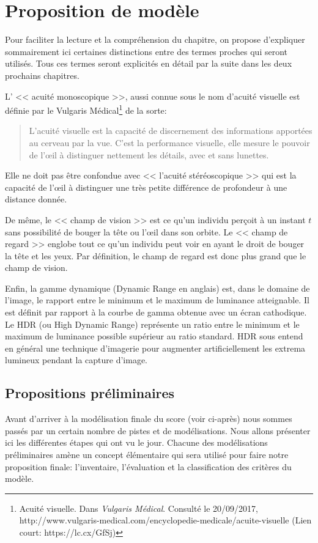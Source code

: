 	\chapter{Proposition de modèle}
	\par Pour faciliter la lecture et la compréhension du chapitre, on propose d'expliquer sommairement ici certaines distinctions entre des termes proches qui seront utilisés. Tous ces termes seront explicités en détail par la suite dans les deux prochains chapitres.

	\par L' << acuité monoscopique >>, aussi connue sous le nom d'acuité visuelle est définie par le Vulgaris Médical\footnote{Acuité visuelle. Dans \textit{Vulgaris Médical}. Consulté le 20/09/2017, http://www.vulgaris-medical.com/encyclopedie-medicale/acuite-visuelle (Lien court: https://lc.cx/GfSj)} de la sorte:
	\begin{quote}
		L'acuité visuelle est la capacité de discernement des informations apportées au cerveau par la vue. C'est la performance visuelle, elle mesure le pouvoir de l'œil à distinguer nettement les détails, avec et sans lunettes.
	\end{quote}
	Elle ne doit pas être confondue avec << l'acuité stéréoscopique >> qui est la capacité de l'œil à distinguer une très petite différence de profondeur à une distance donnée.
	
	\par De même, le << champ de vision >> est ce qu'un individu perçoit à un instant $t$ sans possibilité de bouger la tête ou l'œil dans son orbite. Le << champ de regard >> englobe tout ce qu'un individu peut voir en ayant le droit de bouger la tête et les yeux. Par définition, le champ de regard est donc plus grand que le champ de vision.
	
	\par Enfin, la gamme dynamique (Dynamic Range en anglais) est, dans le domaine de l'image, le rapport entre le minimum et le maximum de luminance atteignable. Il est définit par rapport à la courbe de gamma obtenue avec un écran cathodique. Le HDR (ou High Dynamic Range) représente un ratio entre le minimum et le maximum de luminance possible supérieur au ratio standard. HDR sous entend en général une technique d'imagerie pour augmenter artificiellement les extrema lumineux pendant la capture d'image.
	
	\section{Propositions préliminaires}
	\par Avant d'arriver à la modélisation finale du score (voir ci-après) nous sommes passés par un certain nombre de pistes et de modélisations. Nous allons présenter ici les différentes étapes qui ont vu le jour. Chacune des modélisations préliminaires amène un concept élémentaire qui sera utilisé pour faire notre proposition finale: l'inventaire, l'évaluation et la classification des critères du modèle.
	
